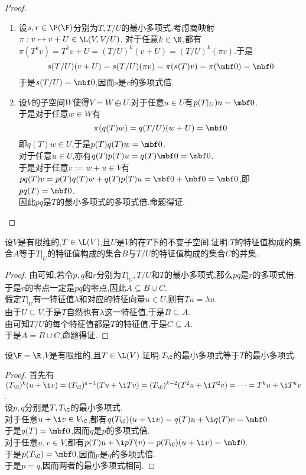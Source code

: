 \documentclass{ctexart}
\begin{document}
\begin{proof}
    \begin{enumerate}[label=\tbf{(\arabic*)}]
        \item 设$s,r\in\P(\F)$分别为$T,T/U$的最小多项式.考虑商映射$\pi:v\mapsto v+U\in\L(V,V/U)$.
            对于任意$k\in\N$,都有$\pi(T^kv)=T^kv+U=(T/U)^k(v+U)=(T/U)^k(\pi v)$.于是
            \[s(T/U)(v+U)=s(T/U)(\pi v)=\pi(s(T)v)=\pi(\mbf0)=\mbf0\]
            于是$s(T/U)=\mbf0$,因而$s$是$r$的多项式倍.
        \item 设$V$的子空间$W$使得$V=W\oplus U$.对于任意$u\in U$有$p(T|_U)u=\mbf0$.\\
            于是对于任意$w\in W$有\[\pi(q(T)w)=q(T/U)(w+U)=\mbf0\]
            即$q(T)w\in U$,于是$p(T)q(T)w=\mbf0$.\\
            对于任意$u\in U$,亦有$q(T)p(T)u=q(T)\mbf0=\mbf0$.\\
            于是对于任意$v:=w+u\in V$有$pq(T)v=p(T)q(T)w+q(T)p(T)u=\mbf0+\mbf0=\mbf0$,即$pq(T)=\mbf0$.\\
            因此$pq$是$T$的最小多项式的多项式倍.命题得证.
    \end{enumerate}
\end{proof}
\begin{problem}[26.]
    设$V$是有限维的,$T\in\L(V)$,且$U$是$V$的在$T$下的不变子空间.证明:$T$的特征值构成的集合$A$等于$T|_U$的特征值构成的集合$B$与$T/U$的特征值构成的集合$C$的并集.
\end{problem}
\begin{proof}
    由可知,若令$p,q$和$r$分别为$T|_U,T/U$和$T$的最小多项式,那么$pq$是$r$的多项式倍.\\
    于是$r$的零点一定是$pq$的零点,因此$A\subseteq B\cup C$.\\
    假定$T|_U$有一特征值$\lambda$和对应的特征向量$u\in U$,则有$Tu=\lambda u$.\\
    由于$U\subseteq V$,于是$T$自然也有$\lambda$这一特征值,于是$B\subseteq A$.\\
    由可知$T/U$的每个特征值都是$T$的特征值,于是$C\subseteq A$.\\
    于是$A=B\cup C$,命题得证.
\end{proof}
\begin{problem}[27.]
    设$\F=\R$,$V$是有限维的,且$T\in\L(V)$.证明:$T_\C$的最小多项式等于$T$的最小多项式.
\end{problem}
\begin{proof}
    首先有$(T_\C)^k(u+\i v)=(T_\C)^{k-1}(Tu+\i Tv)=(T_\C)^{k-2}(T^2u+\i T^2v)=\cdots=T^ku+\i T^kv$.\\
    设$p,q$分别是$T,T_\C$的最小多项式.\\
    对于任意$u+\i v\in V_\C$,都有$q(T_\C)(u+\i v)=q(T)u+\i q(T)v=\mbf0$.\\
    于是$q(T)=\mbf0$,因而$q$是$p$的多项式倍.\\
    对于任意$u,v\in V$,都有$p(T)u+\i pT(v)=p(T_\C)(u+\i v)=\mbf0$.\\
    于是$p(T_\C)=\mbf0$,因而$p$是$q$的多项式倍.\\
    于是$p=q$,因而两者的最小多项式相同.
\end{proof}
\end{document}
